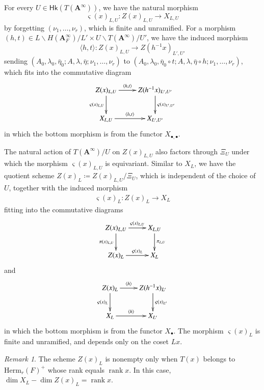 \documentclass[12pt]{amsart}
\numberwithin{equation}{section}
\theoremstyle{plain}
\theoremstyle{definition}
\theoremstyle{remark}
\newtheorem{remark}[proposition]{Remark}
\renewcommand{\b}[1]{\mathbf{#1}}
\renewcommand{\r}[1]{\mathrm{#1}}
\renewcommand{\sf}[1]{\mathsf{#1}}
\renewcommand{\(}{\left(}
\renewcommand{\)}{\right)}
\newcommand{\ang}[1]{\langle{#1}\rangle}
\newcommand{\bA}{\b A}
\newcommand{\Herm}{\r{Herm}}
\newcommand{\Hk}{\sf{Hk}}
\DeclareMathOperator{\rank}{rank}
\begin{document}
For every $U\in\Hk(T(\bA^\infty))$, we have the natural morphism
\[
\varsigma(x)_{L,U}\colon Z(x)_{L,U}\to X_{L,U}
\]
by forgetting $(\nu_1,\dots,\nu_r)$, which is finite and unramified. For a morphism $(h,t)\in L\backslash H(\bA_F^\infty)/L'\times U\backslash T(\bA^\infty)/U'$, we have the induced morphism
\[
\ang{h,t}\colon Z(x)_{L,U}\to Z(h^{-1}x)_{L',U'}
\]
sending $(A_0,\lambda_0,\bar\eta_0;A,\lambda,\bar\eta;\nu_1,\dots,\nu_r)$ to $(A_0,\lambda_0,\bar\eta_0\circ t;A,\lambda,\bar\eta\circ h;\nu_1,\dots,\nu_r)$, which fits into the commutative diagram
\[
\xymatrix{
Z(x)_{L,U} \ar[r]^-{\ang{h,t}}\ar[d]_-{\varsigma(x)_{L,U}} & Z(h^{-1}x)_{L',U'} \ar[d]^-{\varsigma(x)_{L',U'}} \\
X_{L,U} \ar[r]^-{\ang{h,t}} & X_{L',U'}
}
\]
in which the bottom morphism is from the functor $X_{\bullet,\bullet}$.

The natural action of $T(\bA^\infty)/U$ on $Z(x)_{L,U}$ also factors through $\Xi_U$ under which the morphism $\varsigma(x)_{L,U}$ is equivariant. Similar to $X_L$, we have the quotient scheme $Z(x)_L\coloneqq Z(x)_{L,U}/\Xi_U$, which is independent of the choice of $U$, together with the induced morphism
\begin{align}\label{eq:special_morphism_1}
\varsigma(x)_L\colon Z(x)_L\to X_L
\end{align}
fitting into the commutative diagrams
\begin{align}\label{eq:special_morphism_2}
\xymatrix{
Z(x)_{L,U} \ar[r]^-{\varsigma(x)_{L,U}}\ar[d]_-{\pi(x)_{L,U}} & X_{L,U} \ar[d]^-{\pi_{L,U}} \\
Z(x)_L \ar[r]^-{\varsigma(x)_L} & X_L
}
\end{align}
and
\[
\xymatrix{
Z(x)_L \ar[r]^-{\ang{h}}\ar[d]_-{\varsigma(x)_L} & Z(h^{-1}x)_{L'} \ar[d]^-{\varsigma(x)_{L'}} \\
X_L \ar[r]^-{\ang{h}} & X_{L'}
}
\]
in which the bottom morphism is from the functor $X_\bullet$. The morphism $\varsigma(x)_L$ is finite and unramified, and depends only on the coset $Lx$.

\begin{remark}\label{re:special_morphism}
The scheme $Z(x)_L$ is nonempty only when $T(x)$ belongs to $\Herm_r(F)^+$ whose rank equals $\rank x$. In this case, $\dim X_L-\dim Z(x)_L=\rank x$.
\end{remark}
\end{document}
